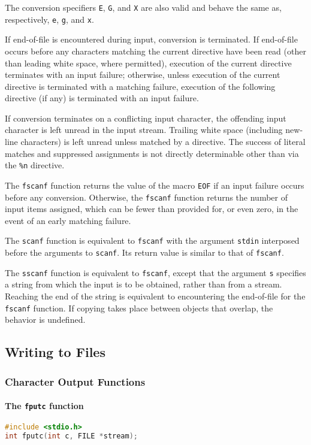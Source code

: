 The conversion specifiers \texttt{E}, \texttt{G}, and \texttt{X} are also valid
and behave the same as, respectively, \texttt{e}, \texttt{g}, and \texttt{x}.

If end-of-file is encountered during input, conversion is terminated. If
end-of-file occurs before any characters matching the current directive have
been read (other than leading white space, where permitted), execution of the
current directive terminates with an input failure; otherwise, unless execution
of the current directive is terminated with a matching failure, execution of
the following directive (if any) is terminated with an input failure.

If conversion terminates on a conflicting input character, the offending input
character is left unread in the input stream. Trailing white space (including
new-line characters) is left unread unless matched by a directive. The success
of literal matches and suppressed assignments is not directly determinable
other than via the \texttt{\%n} directive.

The \texttt{fscanf} function returns the value of the macro \texttt{EOF} if an
input failure occurs before any conversion. Otherwise, the \texttt{fscanf}
function returns the number of input items assigned, which can be fewer than
provided for, or even zero, in the event of an early matching failure.

The \texttt{scanf} function is equivalent to \texttt{fscanf} with the argument
\texttt{stdin} interposed before the arguments to \texttt{scanf}. Its return
value is similar to that of \texttt{fscanf}.

The \texttt{sscanf} function is equivalent to \texttt{fscanf}, except that the
argument \texttt{s} specifies a string from which the input is to be obtained,
rather than from a stream. Reaching the end of the string is equivalent to
encountering the end-of-file for the \texttt{fscanf} function. If copying takes
place between objects that overlap, the behavior is undefined.

\subsection{Writing to Files}
\subsubsection{Character Output Functions}
\paragraph{The \texttt{fputc} function}
\lstset{basicstyle=\scriptsize, numbers=left, captionpos=b, tabsize=4}
\begin{lstlisting}[caption=Section \thesection listing \arabic{filecnt},language={C},
breaklines=true,xleftmargin=15pt,label=lst:section\thesection listing\arabic{filecnt}]
#include <stdio.h>
int fputc(int c, FILE *stream);
\end{lstlisting}

